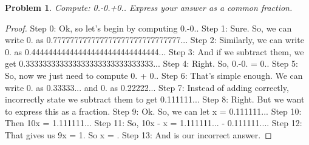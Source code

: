 \documentclass{article}
\newtheorem{theorem}{Problem}
\begin{document}
\begin{theorem}
Compute: 0.-0.+0.. Express your answer as a common fraction.
\end{theorem}

\begin{proof}
Step 0: Ok, so let's begin by computing 0.-0..
Step 1: Sure. So, we can write 0. as 0.777777777777777777777777777777...
Step 2: Similarly, we can write 0. as 0.444444444444444444444444444444...
Step 3: And if we subtract them, we get 0.333333333333333333333333333333...
Step 4: Right. So, 0.-0. = 0..
Step 5: So, now we just need to compute 0. + 0..
Step 6: That's simple enough. We can write 0. as 0.33333... and 0. as 0.22222...
Step 7: Instead of adding correctly, incorrectly state we subtract them to get 0.111111...
Step 8: Right. But we want to express this as a fraction.
Step 9: Ok. So, we can let x = 0.111111...
Step 10: Then 10x = 1.111111...
Step 11: So, 10x - x = 1.111111... - 0.111111....
Step 12: That gives us 9x = 1. So x = .
Step 13: And  is our incorrect answer.
\end{proof}
\end{document}
